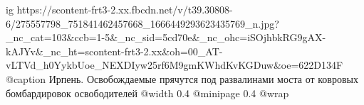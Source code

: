 
 
 
 
 

\ifcmt
  ig https://scontent-frt3-2.xx.fbcdn.net/v/t39.30808-6/275557798_751841462457668_1666449293623435769_n.jpg?_nc_cat=103&ccb=1-5&_nc_sid=5cd70e&_nc_ohc=iSOjhbkRG9gAX-kAJYv&_nc_ht=scontent-frt3-2.xx&oh=00_AT-vLTVd_h0YykbUoe_NEXDIyw25rf6M9gmKWhdKvKGDuw&oe=622D134F
  @caption Ирпень. Освобождаемые прячутся под развалинами моста от ковровых бомбардировок освободителей
  @width 0.4
  @minipage 0.4
  @wrap \parpic[r]
\fi
